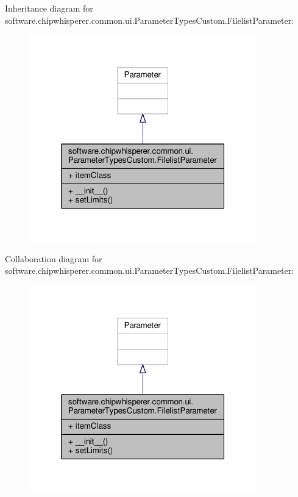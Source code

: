 Inheritance diagram for software.\+chipwhisperer.\+common.\+ui.\+Parameter\+Types\+Custom.\+Filelist\+Parameter\+:\nopagebreak
\begin{figure}[H]
\begin{center}
\leavevmode
\includegraphics[width=280pt]{d7/d45/classsoftware_1_1chipwhisperer_1_1common_1_1ui_1_1ParameterTypesCustom_1_1FilelistParameter__inherit__graph}
\end{center}
\end{figure}


Collaboration diagram for software.\+chipwhisperer.\+common.\+ui.\+Parameter\+Types\+Custom.\+Filelist\+Parameter\+:\nopagebreak
\begin{figure}[H]
\begin{center}
\leavevmode
\includegraphics[width=280pt]{dd/d70/classsoftware_1_1chipwhisperer_1_1common_1_1ui_1_1ParameterTypesCustom_1_1FilelistParameter__coll__graph}
\end{center}
\end{figure}



